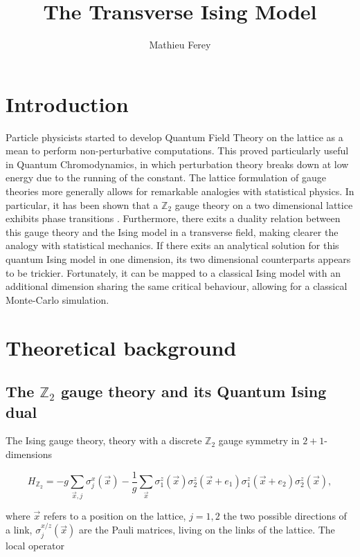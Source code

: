 \documentclass[11pt,openany]{article}
\title{The Transverse Ising Model }
\author{Mathieu Ferey}
\begin{document}
	


\tableofcontents\clearpage

\section{Introduction}

Particle physicists started to develop Quantum Field Theory on the lattice as a mean to perform non-perturbative computations. This proved particularly useful in Quantum Chromodynamics, in which perturbation theory breaks down at low energy due to the running of the constant. The lattice formulation of gauge theories more generally allows for remarkable analogies with statistical physics. In particular, it has been shown that a $\mathds{Z}_2$ gauge theory on a two dimensional lattice exhibits phase transitions \cite{Wegner}. Furthermore, there exits a duality relation between this gauge theory and the Ising model in a transverse field, making clearer the analogy with statistical mechanics. If there exits an analytical solution for this quantum Ising model in one dimension, its two dimensional counterparts appears to be trickier. Fortunately, it can be mapped to a classical Ising model with an additional dimension sharing the same critical behaviour, allowing for a classical Monte-Carlo simulation.

\section{Theoretical background}

\subsection{The $\mathds{Z}_2$ gauge theory and its Quantum Ising dual}

The Ising gauge theory, theory with a discrete $\mathds{Z}_2$ gauge symmetry in $2+1$-dimensions \cite{fradkin}

\begin{equation}
	H_{\mathds{Z}_2} = -g\sum_{\vec{x},j}\sigma^x_j(\vec{x}) - \frac{1}{g}\sum_{\vec{x}}\sigma_1^z(\vec{x})\sigma_2^z(\vec{x}+e_1)\sigma_1^z(\vec{x}+e_2)\sigma_2^z(\vec{x}),
\end{equation}

where $\vec{x}$ refers to a position on the lattice, $j=1,2$ the two possible directions of a link, $\sigma_j^{x/z}(\vec{x})$ are the Pauli matrices, living on the links of the lattice. The local operator
\end{document}

